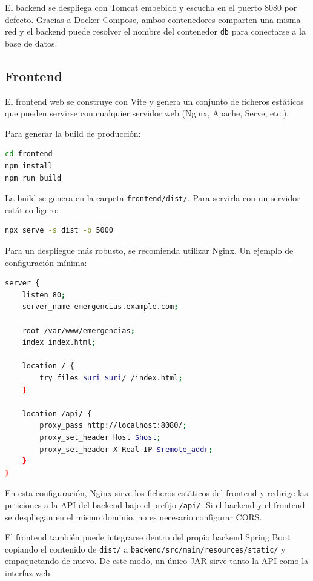 El backend se despliega con Tomcat embebido y escucha en el puerto 8080 por defecto. Gracias a Docker Compose, ambos contenedores comparten una misma red y el backend puede resolver el nombre del contenedor \texttt{db} para conectarse a la base de datos.

\subsection{Frontend}

El frontend web se construye con Vite y genera un conjunto de ficheros estáticos que pueden servirse con cualquier servidor web (Nginx, Apache, Serve, etc.).

Para generar la build de producción:

\begin{lstlisting}[language=Bash]
cd frontend
npm install
npm run build
\end{lstlisting}

La build se genera en la carpeta \texttt{frontend/dist/}. Para servirla con un servidor estático ligero:

\begin{lstlisting}[language=Bash]
npx serve -s dist -p 5000
\end{lstlisting}

Para un despliegue más robusto, se recomienda utilizar Nginx. Un ejemplo de configuración mínima:

\begin{lstlisting}[language=bash]
server {
    listen 80;
    server_name emergencias.example.com;

    root /var/www/emergencias;
    index index.html;

    location / {
        try_files $uri $uri/ /index.html;
    }

    location /api/ {
        proxy_pass http://localhost:8080/;
        proxy_set_header Host $host;
        proxy_set_header X-Real-IP $remote_addr;
    }
}
\end{lstlisting}

En esta configuración, Nginx sirve los ficheros estáticos del frontend y redirige las peticiones a la API del backend bajo el prefijo \texttt{/api/}. Si el backend y el frontend se despliegan en el mismo dominio, no es necesario configurar CORS.

El frontend también puede integrarse dentro del propio backend Spring Boot copiando el contenido de \texttt{dist/} a \texttt{backend/src/main/resources/static/} y empaquetando de nuevo. De este modo, un único JAR sirve tanto la API como la interfaz web.

